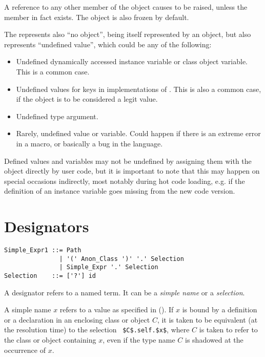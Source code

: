 A reference to any other member of the  object causes  to be raised, unless the member in fact exists. The  object is also frozen by default. 

The  represents also ``no object'', being itself represented by an object, but also represents ``undefined value'', which could be any of the following:
\begin{itemize}
  \item Undefined dynamically accessed instance variable or class object variable. This is a common case. 
  \item Undefined values for keys in implementations of . This is also a common case, if the  object is to be considered a legit value. 
  \item Undefined type argument.
  \item Rarely, undefined value or variable. Could happen if there is an extreme error in a macro, or basically a bug in the language. 
\end{itemize}

Defined values and variables may not be undefined by assigning them with the  object directly by user code, but it is important to note that this may happen on special occasions indirectly, most notably during hot code loading, e.g. if the definition of an instance variable goes missing from the new code version. 





\section{Designators}
\label{sec:designators}

\syntax\begin{lstlisting}
Simple_Expr1 ::= Path
               | '(' Anon_Class ')' '.' Selection
               | Simple_Expr '.' Selection
Selection    ::= ['?'] id
\end{lstlisting}

A designator refers to a named term. It can be a {\em simple name} or a {\em selection}.

A simple name $x$ refers to a value as specified in (). If $x$ is bound by a definition or a declaration in an enclosing class or object $C$, it is taken to be equivalent (at the resolution time) to the selection ~\lstinline!$C$.self.$x$!, where $C$ is taken to refer to the class or object containing $x$, even if the type name $C$ is shadowed at the occurrence of $x$. 

